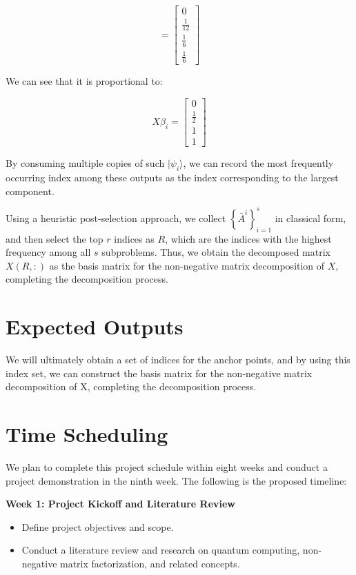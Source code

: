 \documentclass[12pt]{article}
\begin{document}
$$
= \begin{bmatrix}
0 \\
\frac{1}{12} \\
\frac{1}{6} \\
\frac{1}{6}
\end{bmatrix}
$$

We can see that it is proportional to:

$$
X\beta_{i}=\begin{bmatrix}
0 \\
\frac{1}{2} \\
1 \\
1
\end{bmatrix}
$$

By consuming multiple copies of such $|\psi_{i}\rangle$, we can record the most frequently occurring index among these outputs as the index corresponding to the largest component.

Using a heuristic post-selection approach, we collect $\left\{\bar{A}^{i}\right\}_{i=1}^{s}$ in classical form, and then select the top $r$ indices as $R$, which are the indices with the highest frequency among all $s$ subproblems. Thus, we obtain the decomposed matrix $X(R,:)$ as the basis matrix for the non-negative matrix decomposition of $X$, completing the decomposition process.







\section{Expected Outputs}

We will ultimately obtain a set of indices for the anchor points, and by using this index set, we can construct the basis matrix for the non-negative matrix decomposition of X, completing the decomposition process.

\section{Time Scheduling}
We plan to complete this project schedule within eight weeks and conduct a project demonstration in the ninth week. The following is the proposed timeline:

\textbf{Week 1: Project Kickoff and Literature Review}
\begin{itemize}
    \item Define project objectives and scope.
    \item Conduct a literature review and research on quantum computing, non-negative matrix factorization, and related concepts.
\end{itemize}
\end{document}
